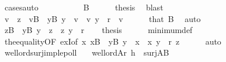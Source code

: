 \begin{isabellebody}
\ {\isacharparenleft}{\kern0pt}cases{\isacharsemicolon}{\kern0pt}auto{\isacharparenright}{\kern0pt}\isanewline
\ \ \ \ \isacommand{{\isacharbraceright}{\kern0pt}}\isamarkupfalse%
\isanewline
\ \ \ \ \isamarkupfalse%
\ B\isanewline
\ \ \ \ \isamarkupfalse%
\ {\isacharquery}{\kern0pt}thesis\ \isamarkupfalse%
\ blast\isanewline
\ \ \isamarkupfalse%
\isanewline
\ \ \isamarkupfalse%
\ {\isachardoublequoteopen}v\ {\isacharequal}{\kern0pt}\ z{\isachardoublequoteclose}\ \ {\isachardoublequoteopen}v{\isasymin}B\ {\isasymand}\ {\isacharparenleft}{\kern0pt}{\isasymforall}y{\isasymin}B{\isachardot}{\kern0pt}\ y\ {\isasymnoteq}\ v\ {\isasymlongrightarrow}\ {\isasymlangle}v{\isacharcomma}{\kern0pt}\ y{\isasymrangle}\ {\isasymin}\ r{\isacharparenright}{\kern0pt}{\isachardoublequoteclose}\ \ v\isanewline
\ \ \ \ \isamarkupfalse%
\ that\ B\ \isamarkupfalse%
\ auto\isanewline
\ \ \isamarkupfalse%
\ {\isacartoucheopen}z{\isasymin}B\ {\isasymand}\ {\isacharparenleft}{\kern0pt}{\isasymforall}y{\isasymin}B{\isachardot}{\kern0pt}\ y\ {\isasymnoteq}\ z\ {\isasymlongrightarrow}\ {\isasymlangle}z{\isacharcomma}{\kern0pt}\ y{\isasymrangle}\ {\isasymin}\ r{\isacharparenright}{\kern0pt}{\isacartoucheclose}\isanewline
\ \ \isamarkupfalse%
\ {\isacharquery}{\kern0pt}thesis\isanewline
\ \ \ \ \isamarkupfalse%
\ minimum{\isacharunderscore}{\kern0pt}def\ \isanewline
\ \ \ \ \isamarkupfalse%
\ the{\isacharunderscore}{\kern0pt}equality{}{\isacharbrackleft}{\kern0pt}OF\ ex{}I{\isacharbrackleft}{\kern0pt}of\ {\isachardoublequoteopen}{\isasymlambda}x\ {\isachardot}{\kern0pt}x{\isasymin}B\ {\isasymand}\ {\isacharparenleft}{\kern0pt}{\isasymforall}y{\isasymin}B{\isachardot}{\kern0pt}\ y\ {\isasymnoteq}\ x\ {\isasymlongrightarrow}\ {\isasymlangle}x{\isacharcomma}{\kern0pt}\ y{\isasymrangle}\ {\isasymin}\ r{\isacharparenright}{\kern0pt}{\isachardoublequoteclose}\ z{\isacharbrackright}{\kern0pt}{\isacharbrackright}{\kern0pt}\isanewline
\ \ \ \ \isamarkupfalse%
\ auto\isanewline
{}\isamarkupfalse%
%
\endisatagproof
{\isafoldproof}%
%
\isadelimproof
\isanewline
%
\endisadelimproof
\isanewline
{}\isamarkupfalse%
\ well{\isacharunderscore}{\kern0pt}ord{\isacharunderscore}{\kern0pt}surj{\isacharunderscore}{\kern0pt}imp{\isacharunderscore}{\kern0pt}lepoll{\isacharcolon}{\kern0pt}\isanewline
\ \ \ {\isachardoublequoteopen}well{\isacharunderscore}{\kern0pt}ord{\isacharparenleft}{\kern0pt}A{\isacharcomma}{\kern0pt}r{\isacharparenright}{\kern0pt}{\isachardoublequoteclose}\ {\isachardoublequoteopen}h\ {\isasymin}\ surj{\isacharparenleft}{\kern0pt}A{\isacharcomma}{\kern0pt}B{\isacharparenright}{\kern0pt}{\isachardoublequoteclose}\isanewline

\end{isabellebody}
